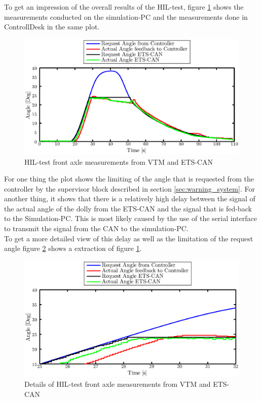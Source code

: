 \documentclass[ExampleMasters.tex]{subfiles}
\begin{document}
To get an impression of the overall results of the \gls{HIL}-test, figure \ref{fig:HIL002_complete} shows the measurements conducted on the simulation-PC and the measurements done in ControllDesk in the same plot. 
\begin{figure}[!htb]
	\centering
	\includegraphics[width=1\linewidth]{figures/HIL006_alles}
	\caption{\acrlong{HIL}-test front axle measurements from VTM and ETS-CAN}	
	\label{fig:HIL002_complete}
\end{figure}

For one thing the plot shows the limiting of the angle that is requested from the controller by the supervisor block described in section \ref{sec:warning_system}. For another thing, it shows that there is a relatively high delay between the signal of the actual angle of the dolly from the \gls{ETS}-\gls{CAN} and the signal that is fed-back to the Simulation-PC. This is most likely caused by the use of the serial interface to transmit the signal from the CAN to the simulation-PC. \\
To get a more detailed view of this delay as well as the limitation of the request angle figure \ref{fig:HIL002_complete_details} shows a extraction of figure \ref{fig:HIL002_complete}.   

\begin{figure}[!htb]
	\centering
	\includegraphics[width=1\linewidth]{figures/HIL006_alles_details}
	\caption{Details of \acrlong{HIL}-test front axle measurements from \acrshort{VTM} and \acrshort{ETS}-\acrshort{CAN}}
	
	\label{fig:HIL002_complete_details}
\end{figure}
\end{document}
